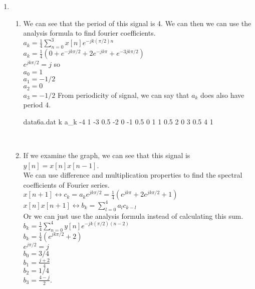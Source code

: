 \documentclass[10pt,a4paper, margin=1in]{article}
\begin{document}
\begin{enumerate}
\item %
    \begin{enumerate}
    \item We can see that the period of this signal is 4. We can then we can use the analysis formula to find fourier coefficients.\\ 
    $a_k = \frac{1}{4}\sum\limits_{n=0}^{3}x[n]e^{-jk(\pi/2)n}$\\
    $a_k = \frac{1}{4}(0+e^{-jk\pi/2} + 2e^{-jk\pi} + e^{-3jk\pi/2})$ \\
    $e^{jk\pi/2} = j$ so\\
    $a_0 = 1$\\
    $a_1 = -1/2$\\
    $a_2 = 0$\\
    $a_3 = -1/2$
    From periodicity of signal, we can say that $a_k$ does also have period 4.\\
    \begin{filecontents}{data6a.dat}
        k    a_k
        -4   1
        -3   0.5
        -2   0
        -1   0.5
        0    1
        1    0.5
        2    0
        3    0.5
        4    1
    \end{filecontents}\\
    \item If we examine the graph, we can see that this signal is $y[n] = x[n]x[n-1]$.\\
    We can use difference and multiplication properties to find the spectral coefficients of Fourier series. \\
    $x[n+1] \leftrightarrow c_k = a_ke^{jk\pi/2} = \frac{1}{4}(e^{jk\pi}+2e^{jk\pi/2}+1)$\\
    $x[n]x[n+1] \leftrightarrow b_k=\sum\limits_{l=0}^4 a_lc_{k-l}$\\
    Or we can just use the analysis formula instead of calculating this sum.\\
    $b_k = \frac{1}{4}\sum\limits_{n=0}^4y[n]e^{-jk(\pi/2)(n-2)}$\\
    $b_k = \frac{1}{4}(e^{jk\pi/2}+2)$\\
    $e^{j\pi/2} = j$\\
    $b_0 = 3/4$\\
    $b_1 = \frac{j+2}{4}$\\
    $b_2 = 1/4$\\
    $b_3= \frac{4-j}{2}$.


\end{enumerate}
\end{enumerate}
\end{document}
